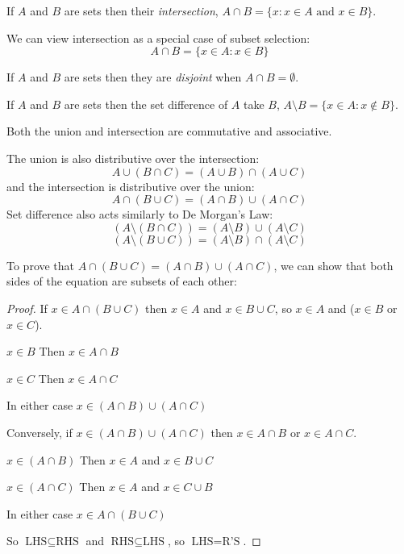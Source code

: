 \documentclass[../main.tex]{subfiles}
\begin{document}
\begin{definition}[Intersection]
  If $A$ and $B$ are sets then their \textit{intersection}, $A \cap B = \{x: x \in A \text{ and } x \in B\}$.
\end{definition}
\begin{remark}[Remark]
  We can view intersection as a special case of subset selection:
  \[
    A \cap B = \{x \in A : x \in B\}
  \]
\end{remark}
\begin{definition}[Disjoint]
  If $A$ and $B$ are sets then they are \textit{disjoint} when $A \cap B = \emptyset$.
\end{definition}
\begin{definition}
  If $A$ and $B$ are sets then the set difference of $A$ take $B$, $A \setminus B = \{x \in A: x \notin B\}$. 
\end{definition}
\begin{remark}[Note]
  Both the union and intersection are commutative and associative.

  The union is also distributive over the intersection:
  \[
    A \cup (B \cap C) = (A \cup B) \cap (A \cup C)
  \]
  and the intersection is distributive over the union:
  \[
    A \cap (B \cup C) = (A \cap B) \cup (A \cap C)
  \]
  Set difference also acts similarly to De Morgan's Law:
  \[
    (A \setminus (B \cap C)) = (A \setminus B) \cup (A \setminus C)
  \]
  \[
    (A \setminus (B \cup C)) = (A \setminus B) \cap (A \setminus C)
  \]
\end{remark}
To prove that $A \cap (B \cup C) = (A \cap B) \cup (A \cap C)$, we can show that both sides of the equation are subsets of each other:
\begin{proof}\par
  If $x \in A \cap (B \cup C)$ then $x \in A$ and $x \in B \cup C$, so $x \in A$ and ($x \in B$ or $x \in C$).
  \begin{proofcases}
    \begin{case}{$x \in B$}
      Then $x \in A \cap B$
    \end{case}
    \begin{case}{$x \in C$}
      Then $x \in A \cap C$
    \end{case}
  \end{proofcases}
  In either case $x \in (A \cap B) \cup (A \cap C)$

  Conversely, if $x \in (A \cap B) \cup (A \cap C)$ then $x \in A \cap B$ or $x \in A \cap C$.
  \begin{proofcases}
    \begin{case}{$x \in (A \cap B)$}
      Then $x \in A$ and $x \in B \cup C$
    \end{case}
    \begin{case}{$x \in (A \cap C)$}
      Then $x \in A$ and $x \in C \cup B$
    \end{case}
  \end{proofcases}
  In either case $x \in A \cap (B \cup C)$

  So $\text{LHS} \subseteq \text{RHS}$ and $\text{RHS} \subseteq \text{LHS}$, so $\text{LHS} = \text{R'S}$.
\end{proof}
\end{document}
